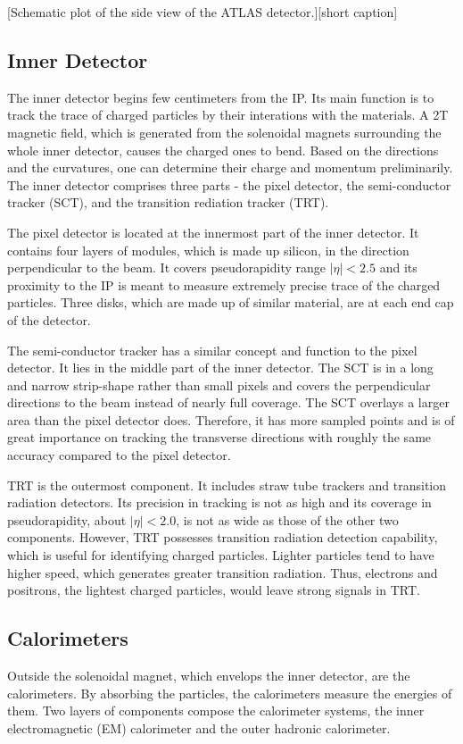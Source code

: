 \documentclass[class=NCU_thesis, crop=false]{standalone}
\begin{document}
	[Schematic plot of the side view of the ATLAS detector.][short caption]
	
	\subsection{Inner Detector}
		The inner detector begins few centimeters from the IP. Its main function is to track the trace of charged particles by their interations with the materials. A 2T magnetic field, which is generated from the solenoidal magnets surrounding the whole inner detector, causes the charged ones to bend. Based on the directions and the curvatures, one can determine their charge and momentum preliminarily. The inner detector comprises three parts - the pixel detector, the semi-conductor tracker (SCT), and the transition rediation tracker (TRT).
		
		The pixel detector is located at the innermost part of the inner detector. It contains four layers of modules, which is made up silicon, in the direction perpendicular to the beam. It covers pseudorapidity range $\lvert \eta \rvert < 2.5$ and its proximity to the IP is meant to measure extremely precise trace of the charged particles. Three disks, which are made up of similar material, are at each end cap of the detector.
		
		The semi-conductor tracker has a similar concept and function to the pixel detector. It lies in the middle part of the inner detector. The SCT is in a long and narrow strip-shape rather than small pixels and covers the perpendicular directions to the beam instead of nearly full coverage. The SCT overlays a larger area than the pixel detector does. Therefore, it has more sampled points and is of great importance on tracking the transverse directions with roughly the same accuracy compared to the pixel detector.
		
		TRT is the outermost component. It includes straw tube trackers and transition radiation detectors. Its precision in tracking is not as high and its coverage in pseudorapidity, about $\rvert \eta \lvert < 2.0$, is not as wide as those of the other two components. However, TRT possesses transition radiation detection capability, which is useful for identifying charged particles. Lighter particles tend to have higher speed, which generates greater transition radiation. Thus, electrons and positrons, the lightest charged particles, would leave strong signals in TRT.
	
	\subsection{Calorimeters}
		Outside the solenoidal magnet, which envelops the inner detector, are the calorimeters. By absorbing the particles, the calorimeters measure the energies of them. Two layers of components compose the calorimeter systems, the inner electromagnetic (EM) calorimeter and the outer hadronic calorimeter.
		
\end{document}
